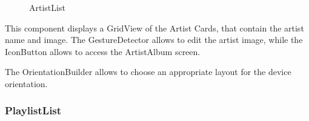 \documentclass{article}
\begin{document}
\begin{figure}[H]
	\noindent
	\caption{ArtistList} 
\end{figure}

This component displays a GridView of the Artist Cards, that contain the artist
name and image. The GestureDetector allows to edit the artist image, while the
IconButton allows to access the ArtistAlbum screen.

The OrientationBuilder allows to choose an appropriate layout for the device
orientation.

\subsubsection{PlaylistList}
\end{document}
